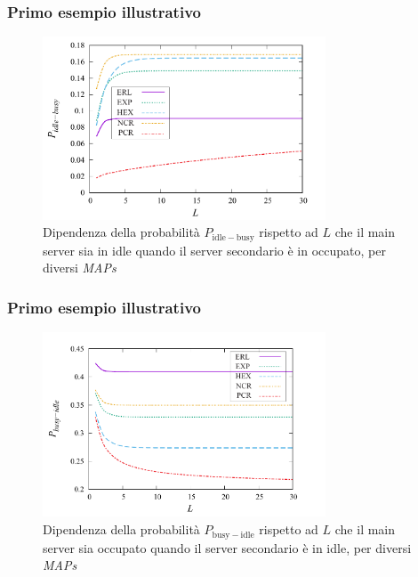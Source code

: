 \documentclass{beamer}
\begin{document}
\begin{frame}
    \frametitle{Primo esempio illustrativo}
    \begin{figure}[h]
        \centering
        \includegraphics[width=0.75\textwidth]{VrxLKYI.png}
        \caption{Dipendenza della probabilità $P_{\mathrm{idle-busy}}$ rispetto ad $L$ che il main server sia in idle quando il server secondario è in occupato, per diversi \emph{MAPs}}
        \label{fig:4}
    \end{figure}
\end{frame}


\begin{frame}
    \frametitle{Primo esempio illustrativo}
    \begin{figure}
        \centering
        \includegraphics[width=0.75\textwidth]{EZp90oP.png}
        \caption{Dipendenza della probabilità $P_{\mathrm{busy-idle}}$ rispetto ad $L$ che il main server sia occupato quando il server secondario è in idle, per diversi \emph{MAPs}}
        \label{fig:5}
    \end{figure}
\end{frame}
\end{document}

